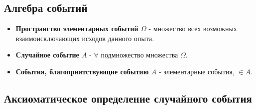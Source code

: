 \documentclass[a5paper,10pt]{article}
\begin{document}
		\subsection{Алгебра событий}
			\begin{itemize}[label={}]
				\item \textbf{Пространство элементарных событий $\Omega$} - множество всех возможных взаимоисключающих исходов данного опыта.
				\item \textbf{Случайное событие $A$} - $\forall$ подмножество множества $\Omega$.
				\item \textbf{События, благоприятствующие событию $A$} - элементарные события, $\in A$.
			\end{itemize}

		\subsection{Аксиоматическое определение случайного события}
		
\end{document}
